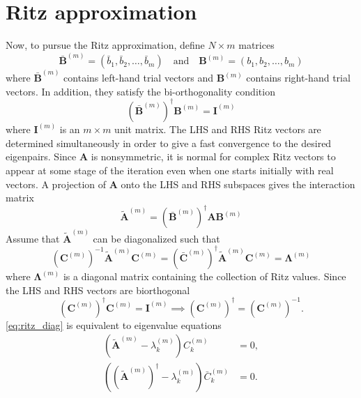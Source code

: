 \section{Ritz approximation}
Now, to pursue the Ritz approximation, define $N \times m$ matrices
\begin{equation}
\bm{\bar{B}}^{(m)} = \left(\bar{b}_1, \bar{b}_2, \ldots, \bar{b}_m\right) \quad \text{and} \quad \bm{B}^{(m)} = \left(b_1, b_2, \ldots, b_m\right)
\end{equation}
where $\bm{\bar{B}}^{(m)}$ contains left-hand trial vectors and $\bm{B}^{(m)}$ contains right-hand trial vectors. In addition, they satisfy the bi-orthogonality condition
\begin{equation}
\left(\bm{\bar{B}}^{(m)}\right)^\dagger \bm{B}^{(m)} = \bm{I}^{(m)}
\end{equation}
where $\bm{I}^{(m)}$ is an $m \times m$ unit matrix. The LHS and RHS Ritz vectors are determined simultaneously in order to give a fast convergence to the desired eigenpairs. Since $\bm{A}$ is nonsymmetric, it is normal for complex Ritz vectors to appear at some stage of the iteration even when one starts initially with real vectors. A projection of $\bm{A}$ onto the LHS and RHS subspaces gives the interaction matrix
\begin{equation}
\bm{\tilde{A}}^{(m)} = \left(\bm{\bar{B}}^{(m)}\right)^\dagger \bm{A} \bm{B}^{(m)}
\end{equation}
Assume that $\bm{\tilde{A}}^{(m)}$ can be diagonalized such that
\begin{equation}
\left(\bm{C}^{(m)}\right)^{-1} \bm{\tilde{A}}^{(m)} \bm{C}^{(m)} = \left(\bar{\bm{C}}^{(m)}\right)^\dagger \bm{\tilde{A}}^{(m)} \bm{C}^{(m)} = \bm{\Lambda}^{(m)}
\label{eq:ritz_diag}
\end{equation}
where $\bm{\Lambda}^{(m)}$ is a diagonal matrix containing the collection of Ritz values. Since the LHS and RHS vectors are biorthogonal
\begin{equation}
\left(\bm{C}^{(m)}\right)^\dagger \bm{C}^{(m)} = \bm{I}^{(m)} \implies \left(\bm{C}^{(m)}\right)^\dagger = \left(\bm{C}^{(m)}\right)^{-1}.
\end{equation}
\ref{eq:ritz_diag} is equivalent to eigenvalue equations
\begin{align}
\left(\bm{\tilde{A}}^{(m)} - \lambda_k^{(m)}\right) {C}_k^{(m)} & = 0, \\
\left(\left(\bm{\tilde{A}}^{(m)}\right)^\dagger - \lambda_k^{(m)}\right) \bar{{C}}_k^{(m)} & = 0.
\label{eq:ritz_eigen}
\end{align}
